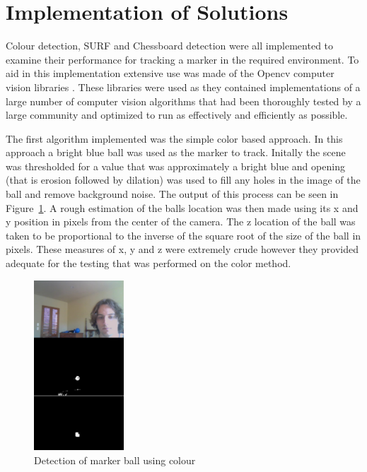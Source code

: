 \section{Implementation of Solutions}

Colour detection, SURF and Chessboard detection were all implemented to examine their performance for tracking a marker in the required environment. To aid in this implementation extensive use was made of the Opencv computer vision libraries \cite{opencv}. These libraries were used as they contained implementations of a large number of computer vision algorithms that had been thoroughly tested by a large community and optimized to run as effectively and efficiently as possible.

The first algorithm implemented was the simple color based approach. In this approach a bright blue ball was used as the marker to track. Initally the scene was thresholded for a value that was approximately  a bright blue and opening (that is erosion followed by dilation) was used to fill any holes in the image of the ball and remove background noise. The output of this process can be seen in Figure~\ref{ball}. A rough estimation of the balls location was then made using its x and y position in pixels from the center of the camera. The z location of the ball was taken to be proportional to the inverse of the square root of the size of the ball in pixels. These measures of x, y and z were extremely crude however they provided adequate for the testing that was performed on the color method.

\begin{figure}[ht]
	\begin{center}
		\includegraphics[width=0.3\textwidth]{2}
	\end{center}
	\caption{Detection of marker ball using colour}
	\label{ball}
\end{figure}

